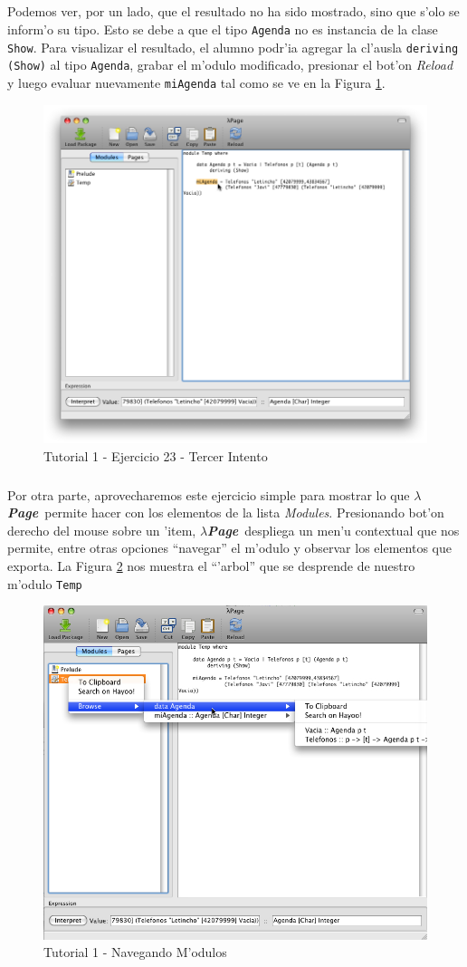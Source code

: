 \documentclass[a4paper]{article}
\newcommand{\hpage}{\textbf{\textsl{$\lambda$Page}}}
\begin{document}
\subparagraph{}Podemos ver, por un lado, que el resultado no ha sido mostrado, sino que s'olo se inform'o su tipo.  Esto se debe a que el tipo \texttt{Agenda} no es instancia de la clase \texttt{Show}.  Para visualizar el resultado, el alumno podr'ia agregar la cl'ausla \texttt{deriving (Show)} al tipo \texttt{Agenda}, grabar el m'odulo modificado, presionar el bot'on \textsl{Reload} y luego evaluar nuevamente \texttt{miAgenda} tal como se ve en la Figura \ref{tut112}.
\begin{figure}[hp]
	\begin{center}
        	\includegraphics[width=.75\textwidth]{pictures/tut1/12}
		\caption{Tutorial 1 - Ejercicio 23 - Tercer Intento}
		\label{tut112}
	\end{center}
\end{figure}
\subparagraph{}Por otra parte, aprovecharemos este ejercicio simple para mostrar lo que \hpage\ permite hacer con los elementos de la lista \textsl{Modules}.  Presionando bot'on derecho del mouse sobre un 'item, \hpage\ despliega un men'u contextual que nos permite, entre otras opciones ``navegar''  el m'odulo y observar los elementos que exporta.  La Figura \ref{tut113} nos muestra el ``'arbol'' que se desprende de nuestro m'odulo \texttt{Temp}
\begin{figure}[hp]
	\begin{center}
        	\includegraphics[width=.75\textwidth]{pictures/tut1/13}
		\caption{Tutorial 1 - Navegando M'odulos}
		\label{tut113}
	\end{center}
\end{figure}
\end{document}

